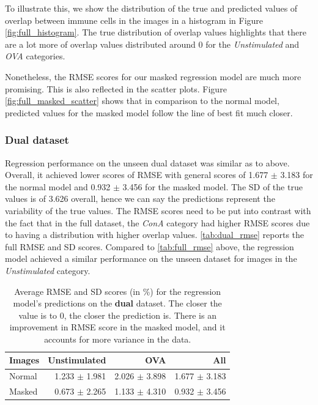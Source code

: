 To illustrate this, we show the distribution of the true and predicted values of overlap between immune cells in the images in a histogram in Figure \ref{fig:full_histogram}. The true distribution of overlap values highlights that there are a lot more of overlap values distributed around 0 for the \textit{Unstimulated} and \textit{OVA} categories. 

Nonetheless, the RMSE scores for our masked regression model are much more promising. This is also reflected in the scatter plots. Figure \ref{fig:full_masked_scatter} shows that in comparison to the normal model, predicted values for the masked model follow the line of best fit much closer. 

\bigskip
\subsubsection{Dual dataset}
\hfill
\hfill 

Regression performance on the unseen dual dataset was similar as to above. Overall, it achieved lower scores of RMSE with general scores of 1.677 $\pm$ 3.183 for the normal model and 0.932 $\pm$ 3.456 for the masked model. The SD of the true values is of 3.626 overall, hence we can say the predictions represent the variability of the true values. The RMSE scores need to be put into contrast with the fact that in the full dataset, the \textit{ConA} category had higher RMSE scores due to having a distribution with higher overlap values. \autoref{tab:dual_rmse} reports the full RMSE and SD scores. Compared to \autoref{tab:full_rmse} above, the regression model achieved a similar performance on the unseen dataset for images in the \textit{Unstimulated} category. 

\begin{table}[h!]
\centering
\caption{Average RMSE and SD scores (in \%) for the regression model's predictions on the \textbf{dual} dataset. The closer the value is to 0, the closer the prediction is. There is an improvement in RMSE score in the masked model, and it accounts for more variance in the data.}
\label{tab:dual_rmse}
\begin{tabular}{l|rr|r}
\rowcolor[HTML]{EFEFEF}
\textbf{Images} & \cellcolor[HTML]{FFCCC9}\textbf{Unstimulated} & \cellcolor[HTML]{C9FFCB}\textbf{OVA} & \textbf{All} \\ \hline
Normal      & 1.233 $\pm$ 1.981  & 2.026 $\pm$ 3.898  &   1.677 $\pm$ 3.183  \\ \hline
Masked      &    0.673 $\pm$ 2.265   &  1.133 $\pm$ 4.310   &   0.932 $\pm$ 3.456 
\end{tabular}
\end{table}

